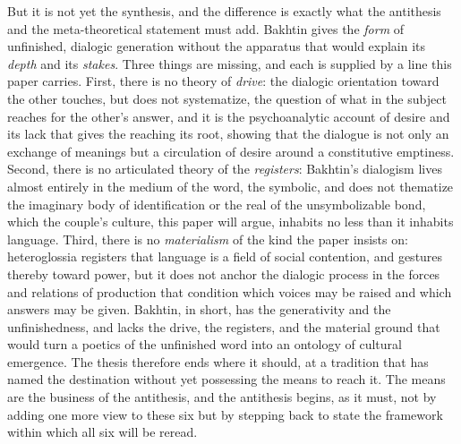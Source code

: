 But it is not yet the synthesis, and the difference is exactly what the antithesis and the meta-theoretical statement must add. Bakhtin gives the \emph{form} of unfinished, dialogic generation without the apparatus that would explain its \emph{depth} and its \emph{stakes}. Three things are missing, and each is supplied by a line this paper carries. First, there is no theory of \emph{drive}: the dialogic orientation toward the other touches, but does not systematize, the question of what in the subject reaches for the other's answer, and it is the psychoanalytic account of desire and its lack that gives the reaching its root, showing that the dialogue is not only an exchange of meanings but a circulation of desire around a constitutive emptiness. Second, there is no articulated theory of the \emph{registers}: Bakhtin's dialogism lives almost entirely in the medium of the word, the symbolic, and does not thematize the imaginary body of identification or the real of the unsymbolizable bond, which the couple's culture, this paper will argue, inhabits no less than it inhabits language. Third, there is no \emph{materialism} of the kind the paper insists on: heteroglossia registers that language is a field of social contention, and gestures thereby toward power, but it does not anchor the dialogic process in the forces and relations of production that condition which voices may be raised and which answers may be given. Bakhtin, in short, has the generativity and the unfinishedness, and lacks the drive, the registers, and the material ground that would turn a poetics of the unfinished word into an ontology of cultural emergence. The thesis therefore ends where it should, at a tradition that has named the destination without yet possessing the means to reach it. The means are the business of the antithesis, and the antithesis begins, as it must, not by adding one more view to these six but by stepping back to state the framework within which all six will be reread.
